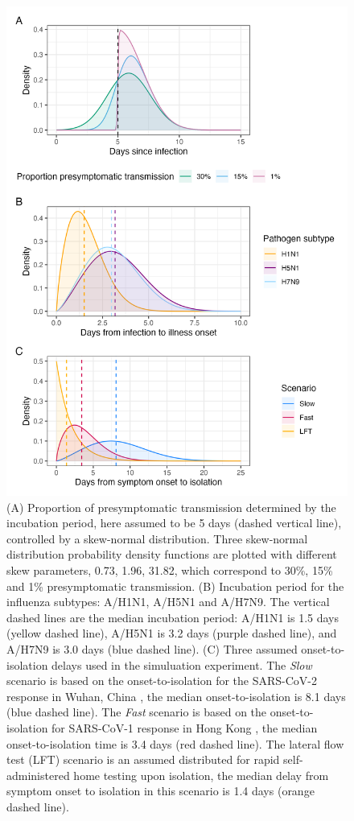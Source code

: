 \documentclass{article}
\begin{document}
\begin{figure}[ht]
\centering
\includegraphics[width=\textwidth,height=0.85\textheight]{../plots/delay_distributions.png}
\caption{(A) Proportion of presymptomatic transmission determined by the incubation period, here assumed to be 5 days (dashed vertical line), controlled by a skew-normal distribution. Three skew-normal distribution probability density functions are plotted with different skew parameters, 0.73, 1.96, 31.82, which correspond to 30\%, 15\% and 1\% presymptomatic transmission. (B) Incubation period for the influenza subtypes: A/H1N1, A/H5N1 and A/H7N9. The vertical dashed lines are the median incubation period: A/H1N1 is 1.5 days (yellow dashed line), A/H5N1 is 3.2 days (purple dashed line), and A/H7N9 is 3.0 days (blue dashed line). (C) Three assumed onset-to-isolation delays used in the simuluation experiment. The \textit{Slow} scenario is based on the onset-to-isolation for the SARS-CoV-2 response in Wuhan, China \citep{liEarlyTransmissionDynamics2020}, the median onset-to-isolation is 8.1 days (blue dashed line). The \textit{Fast} scenario is based on the onset-to-isolation for SARS-CoV-1 response in Hong Kong \citep{donnellyEpidemiologicalDeterminantsSpread2003a}, the median onset-to-isolation time is 3.4 days (red dashed line). The lateral flow test (LFT) scenario is an assumed distributed for rapid self-administered home testing upon isolation, the median delay from symptom onset to isolation in this scenario is 1.4 days (orange dashed line).}
\label{fig:delay-distributions}
\end{figure}
\end{document}
